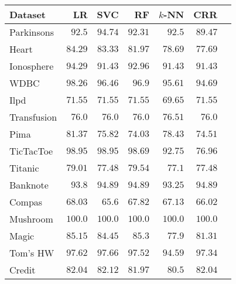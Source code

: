 \begin{table}
	\begin{center}
		\begin{tabular}{l   r r r r r  r }
			\toprule
			{Dataset}  & LR & SVC & RF & $k$-NN & CRR\\\midrule
			\multirow{1}{*}{ Parkinsons}   & $   92.5  $    & $   94.74  $    & $   92.31  $    & $   92.5  $    & $   89.47  $   \\ 
			\multirow{1}{*}{ Heart}   & $   84.29  $    & $   83.33  $    & $   81.97  $    & $   78.69  $    & $   77.69  $   \\ 
			\multirow{1}{*}{ Ionosphere}   & $   94.29  $    & $   91.43  $    & $   92.96  $    & $   91.43  $    & $   91.43  $   \\ 
			\multirow{1}{*}{ WDBC}   & $   98.26  $    & $   96.46  $    & $   96.9  $    & $   95.61  $    & $   94.69  $   \\ 
			\multirow{1}{*}{ Ilpd}   & $   71.55  $    & $   71.55  $    & $   71.55  $    & $   69.65  $    & $   71.55  $   \\ 
			\multirow{1}{*}{ Transfusion}   & $   76.0  $    & $   76.0  $    & $   76.0  $    & $   76.51  $    & $   76.0  $   \\ 
			\multirow{1}{*}{ Pima}   & $   81.37  $    & $   75.82  $    & $   74.03  $    & $   78.43  $    & $   74.51  $   \\ 
			\multirow{1}{*}{ TicTacToe}   & $   98.95  $    & $   98.95  $    & $   98.69  $    & $   92.75  $    & $   76.96  $   \\ 
			\multirow{1}{*}{ Titanic}   & $   79.01  $    & $   77.48  $    & $   79.54  $    & $   77.1  $    & $   77.48  $   \\ 
			\multirow{1}{*}{ Banknote}   & $   93.8  $    & $   94.89  $    & $   94.89  $    & $   93.25  $    & $   94.89  $   \\ 
			\multirow{1}{*}{ Compas}   & $   68.03  $    & $   65.6  $    & $   67.82  $    & $   67.13  $    & $   66.02  $   \\ 
			\multirow{1}{*}{ Mushroom}   & $   100.0  $    & $   100.0  $    & $   100.0  $    & $   100.0  $    & $   100.0  $   \\ 
			\multirow{1}{*}{ Magic}   & $   85.15  $    & $   84.45  $    & $   85.3  $    & $   77.9  $    & $   81.31  $   \\ 
			\multirow{1}{*}{ Tom's HW}   & $   97.62  $    & $   97.66  $    & $   97.52  $    & $   94.59  $    & $   97.34  $   \\ 
			\multirow{1}{*}{ Credit}   & $   82.04  $    & $   82.12  $    & $   81.97  $    & $   80.5  $    & $   82.04  $   \\ 

\end{tabular}
\end{center}
\end{table}
